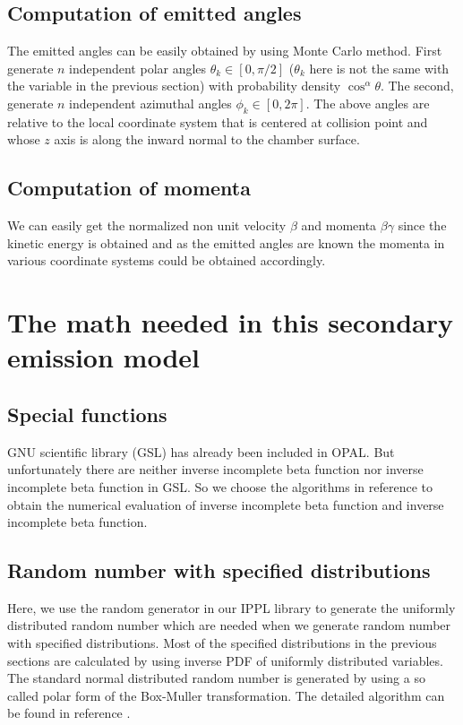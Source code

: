 \documentclass[a4paper,11pt]{article}
\begin{document}
\subsection{Computation of emitted angles}
The emitted angles can be easily obtained by using Monte Carlo method. First generate $n$ independent polar angles $\theta_k \in [0,\pi/2]$ ($\theta_k$ here is not the same with the variable in the previous section) with probability density $\cos^{\alpha}{\theta}$. The second, generate $n$ independent azimuthal angles $\phi_k \in [0,2\pi]$. The above angles are relative to the local coordinate system that is centered at collision point and whose $z$ axis is along the inward normal to the chamber surface.
\subsection{Computation of momenta}  
We can easily get the normalized non unit velocity $\beta$ and momenta $\beta\gamma$ since the kinetic energy is obtained and as the emitted angles are known the momenta in various coordinate systems could be obtained accordingly.
\section{The math needed in this secondary emission model}
\subsection{Special functions}
GNU scientific library (GSL) has already been included in OPAL. But unfortunately there are neither inverse incomplete beta function nor inverse incomplete beta function in GSL. So we choose the algorithms in reference \cite{NR} to obtain the numerical evaluation of inverse incomplete beta function and inverse incomplete beta function.
\subsection{Random number with specified distributions}
Here, we use the random generator in our IPPL library to generate the uniformly distributed random number which are needed when we generate random number with specified distributions. Most of the specified distributions in the previous sections are calculated by using inverse PDF of uniformly distributed variables.\\

The standard normal distributed random number is generated by using a so called polar form of the Box-Muller transformation. The detailed algorithm can be found in reference \cite{GR}.\\
\end{document}
